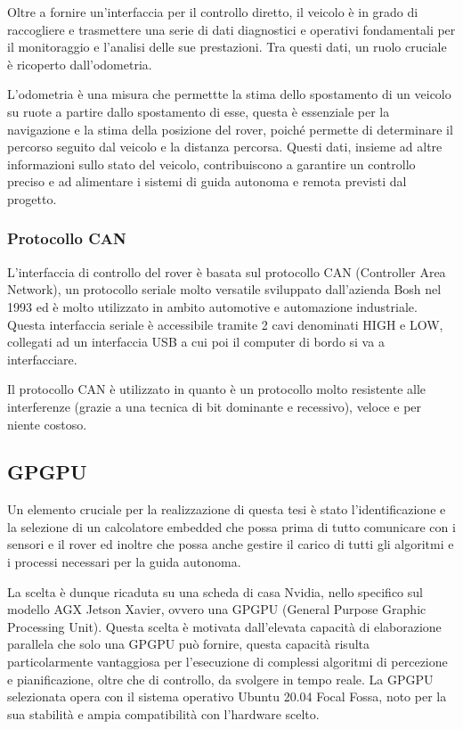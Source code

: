 \noindent Oltre a fornire un'interfaccia per il controllo diretto, il veicolo è in grado di raccogliere e trasmettere una serie di dati diagnostici e operativi fondamentali per il monitoraggio e l'analisi delle sue prestazioni. Tra questi dati, un ruolo cruciale è ricoperto dall'odometria. 

\noindent L'odometria è una misura che permettte la stima dello spostamento di un veicolo su ruote a partire dallo spostamento di esse, questa è essenziale per la navigazione e la stima della posizione del rover, poiché permette di determinare il percorso seguito dal veicolo e la distanza percorsa. Questi dati, insieme ad altre informazioni sullo stato del veicolo, contribuiscono a garantire un controllo preciso e ad alimentare i sistemi di guida autonoma e remota previsti dal progetto.

\subsubsection{Protocollo CAN}
L'interfaccia di controllo del rover è basata sul protocollo CAN (Controller Area Network), un protocollo seriale molto versatile sviluppato dall'azienda Bosh nel 1993 ed è molto utilizzato in ambito automotive e automazione industriale. Questa interfaccia seriale è accessibile tramite 2 cavi denominati HIGH e LOW, collegati ad un interfaccia USB a cui poi il computer di bordo si va a interfacciare.

\noindent Il protocollo CAN è utilizzato in quanto è un protocollo molto resistente alle interferenze (grazie a una tecnica di bit dominante e recessivo), veloce e per niente costoso.  

\subsection{GPGPU}
Un elemento cruciale per la realizzazione di questa tesi è stato l'identificazione e la selezione di un calcolatore embedded che possa prima di tutto comunicare con i sensori e il rover ed inoltre che possa anche gestire il carico di tutti gli algoritmi e i processi necessari per la guida autonoma.

\noindent La scelta è dunque ricaduta su una scheda di casa Nvidia, nello specifico sul modello AGX Jetson Xavier, ovvero una GPGPU (General Purpose Graphic Processing Unit). Questa scelta è motivata dall'elevata capacità di elaborazione parallela che solo una GPGPU può fornire, questa capacità risulta particolarmente vantaggiosa per l'esecuzione di complessi algoritmi di percezione e pianificazione, oltre che di controllo, da svolgere in tempo reale. La GPGPU selezionata opera con il sistema operativo Ubuntu 20.04 Focal Fossa, noto per la sua stabilità e ampia compatibilità con l'hardware scelto.

